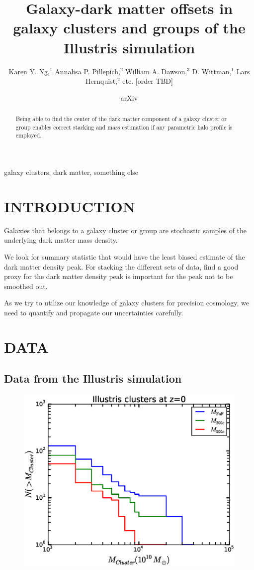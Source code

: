 \documentclass[letterpaper,useAMS,usenatbib]{mn2e}
\title[
	Galaxy-dark matter offsets in galaxy clusters and groups of the
Illustris simulation
]
{Galaxy-dark matter offsets in galaxy clusters and groups of the
Illustris simulation}
\author[Karen Y. Ng et al.]{Karen Y. Ng,$^{1}$
	Annalisa P. Pillepich,$^{2}$ 
	William A. Dawson,$^{3}$ 
	D. Wittman,$^{1}$
	\newauthor Lars Hernquist,$^{2}$
	etc. [order TBD]
}
\begin{document}
\date{arXiv} \pagerange{\pageref{firstpage}--\pageref{lastpage}}
 \maketitle\label{firstpage}
\begin{abstract} 
	Being able to find the center of the dark matter component of a galaxy cluster or
	group enables correct stacking and mass estimation if any parametric halo
	profile is employed. 
\end{abstract}
\begin{keywords}
	galaxy clusters, dark matter, something else 
\end{keywords}
\section{INTRODUCTION} 

Galaxies that belongs to a galaxy cluster or group are stochastic samples
of the underlying dark matter mass density. 

We look for summary statistic that would have the least biased estimate of
the dark matter density peak. For stacking the different sets of data, 
find a good proxy for the dark matter density peak is important for the
peak not to be smoothed out. 

As we try to utilize our knowledge of galaxy clusters for precision cosmology,
we need to quantify and propagate our uncertainties carefully.



\section{DATA}

\subsection{Data from the Illustris simulation} 
\begin{figure}
	\includegraphics[width=.95\linewidth]{clusterMassDist.eps}
	\caption{
		\label{fig:config}}
\end{figure}
\end{document}
